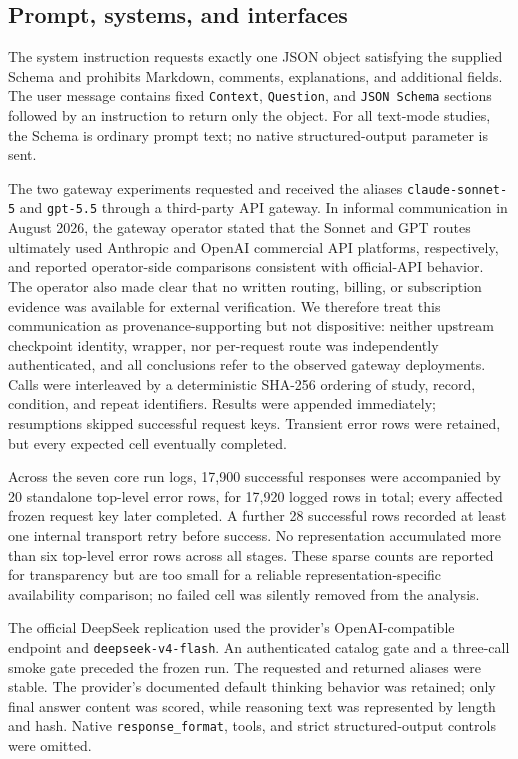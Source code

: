 \documentclass[11pt,a4paper]{article}
\begin{document}
\subsection{Prompt, systems, and interfaces}
The system instruction requests exactly one JSON object satisfying the supplied Schema and prohibits Markdown, comments, explanations, and additional fields. The user message contains fixed \texttt{Context}, \texttt{Question}, and \texttt{JSON Schema} sections followed by an instruction to return only the object. For all text-mode studies, the Schema is ordinary prompt text; no native structured-output parameter is sent.

The two gateway experiments requested and received the aliases \texttt{claude-sonnet-5} and \texttt{gpt-5.5} through a third-party API gateway. In informal communication in August 2026, the gateway operator stated that the Sonnet and GPT routes ultimately used Anthropic and OpenAI commercial API platforms, respectively, and reported operator-side comparisons consistent with official-API behavior. The operator also made clear that no written routing, billing, or subscription evidence was available for external verification. We therefore treat this communication as provenance-supporting but not dispositive: neither upstream checkpoint identity, wrapper, nor per-request route was independently authenticated, and all conclusions refer to the observed gateway deployments. Calls were interleaved by a deterministic SHA-256 ordering of study, record, condition, and repeat identifiers. Results were appended immediately; resumptions skipped successful request keys. Transient error rows were retained, but every expected cell eventually completed.

Across the seven core run logs, 17,900 successful responses were accompanied by 20 standalone top-level error rows, for 17,920 logged rows in total; every affected frozen request key later completed. A further 28 successful rows recorded at least one internal transport retry before success. No representation accumulated more than six top-level error rows across all stages. These sparse counts are reported for transparency but are too small for a reliable representation-specific availability comparison; no failed cell was silently removed from the analysis.

The official DeepSeek replication used the provider's OpenAI-compatible endpoint and \texttt{deepseek-v4-flash}. An authenticated catalog gate and a three-call smoke gate preceded the frozen run. The requested and returned aliases were stable. The provider's documented default thinking behavior was retained; only final answer content was scored, while reasoning text was represented by length and hash. Native \texttt{response\_format}, tools, and strict structured-output controls were omitted.
\end{document}
